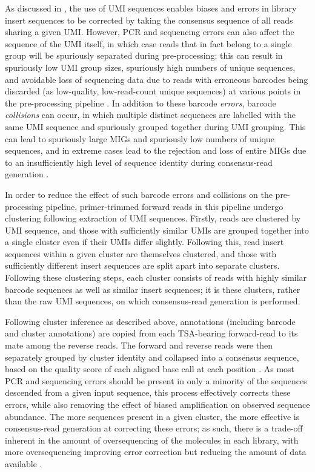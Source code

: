 As discussed in , the use of UMI sequences enables biases and errors in library insert sequences to be corrected by taking the consensus sequence of all reads sharing a given UMI. However, PCR and sequencing errors can also affect the sequence of the UMI itself, in which case reads that in fact belong to a single group will be spuriously separated during pre-processing; this can result in spuriously low UMI group sizes, spuriously high numbers of unique sequences, and avoidable loss of sequencing data due to reads with erroneous barcodes being discarded (as low-quality, low-read-count unique sequences) at various points in the pre-processing pipeline \parencite{shlemov2017igrec}. In addition to these barcode \textit{errors}, barcode \textit{collisions} can occur, in which multiple distinct sequences are labelled with the same UMI sequence and spuriously grouped together during UMI grouping. This can lead to spuriously large MIGs and spuriously low numbers of unique sequences, and in extreme cases lead to the rejection and loss of entire MIGs due to an insufficiently high level of sequence identity during consensus-read generation \parencite{shlemov2017igrec}.

In order to reduce the effect of such barcode errors and collisions on the pre-processing pipeline, primer-trimmed forward reads in this pipeline undergo clustering following extraction of UMI sequences. Firstly, reads are clustered by UMI sequence, and those with sufficiently similar UMIs are grouped together into a single cluster even if their UMIs differ slightly. Following this, read insert sequences within a given cluster are themselves clustered, and those with sufficiently different insert sequences are split apart into separate clusters. Following these clustering steps, each cluster consists of reads with highly similar barcode sequences as well as similar insert sequences; it is these clusters, rather than the raw UMI sequences, on which consensus-read generation is performed.

Following cluster inference as described above, annotations (including barcode and cluster annotations) are copied from each TSA-bearing forward-read to its mate among the reverse reads. The forward and reverse reads were then separately grouped by cluster identity and collapsed into a consensus sequence, based on the quality score of each aligned base call at each position \parencite{vanderheiden2014presto}. As most PCR and sequencing errors should be present in only a minority of the sequences descended from a given input sequence, this process effectively corrects these errors, while also removing the effect of biased amplification on observed sequence abundance. The more sequences present in a given cluster, the more effective is consensus-read generation at correcting these errors; as such, there is a trade-off inherent in the amount of oversequencing of the molecules in each library, with more oversequencing improving error correction but reducing the amount of data available \parencite{turchaninova2016igprep}.

